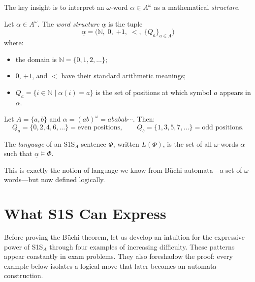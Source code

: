 The key insight is to interpret an $\omega$-word $\alpha \in A^\omega$
as a mathematical \emph{structure}.

\begin{definition}
\label{def:word-structure}
Let $\alpha \in A^\omega$.  The \emph{word structure} $\underline{\alpha}$
is the tuple
\[
  \underline{\alpha} = \bigl(\mathbb{N},\; 0,\; {+1},\; {<},\;
                             \{Q_a\}_{a \in A}\bigr)
\]
where:
\begin{itemize}
  \item the domain is $\mathbb{N} = \{0, 1, 2, \ldots\}$;
  \item $0$, ${+1}$, and ${<}$ have their standard arithmetic meanings;
  \item $Q_a = \{i \in \mathbb{N} \mid \alpha(i) = a\}$ is the set of
        positions at which symbol $a$ appears in $\alpha$.
\end{itemize}
\end{definition}

\begin{example}
Let $A = \{a, b\}$ and $\alpha = (ab)^\omega = ababab\cdots$.  Then:
\[
  Q_a = \{0, 2, 4, 6, \ldots\} = \text{even positions}, \qquad
  Q_b = \{1, 3, 5, 7, \ldots\} = \text{odd positions}.
\]
\end{example}

\begin{definition}
The \emph{language} of an S1S$_A$ sentence $\Phi$, written $L(\Phi)$,
is the set of all $\omega$-words $\alpha$ such that $\underline{\alpha}
\models \Phi$.
\end{definition}

This is exactly the notion of language we know from Büchi automata---a
set of $\omega$-words---but now defined logically.

\section{What S1S Can Express}
\label{sec:s1s-expressive}

Before proving the Büchi theorem, let us develop an intuition for the
expressive power of S1S$_A$ through four examples of increasing
difficulty.  These patterns appear constantly in exam problems.
They also foreshadow the proof: every example below isolates a logical move
that later becomes an automata construction.



